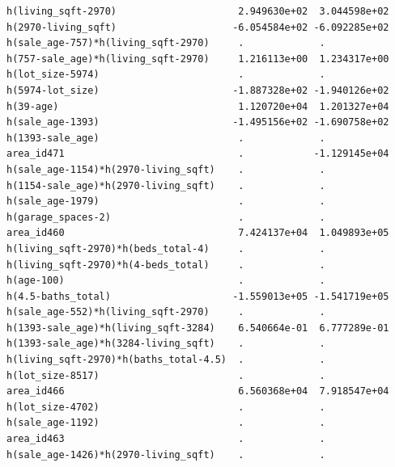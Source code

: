\documentclass[
]{article}
\begin{document}
\begin{verbatim}
h(living_sqft-2970)                     2.949630e+02  3.044598e+02
h(2970-living_sqft)                    -6.054584e+02 -6.092285e+02
h(sale_age-757)*h(living_sqft-2970)     .             .           
h(757-sale_age)*h(living_sqft-2970)     1.216113e+00  1.234317e+00
h(lot_size-5974)                        .             .           
h(5974-lot_size)                       -1.887328e+02 -1.940126e+02
h(39-age)                               1.120720e+04  1.201327e+04
h(sale_age-1393)                       -1.495156e+02 -1.690758e+02
h(1393-sale_age)                        .             .           
area_id471                              .            -1.129145e+04
h(sale_age-1154)*h(2970-living_sqft)    .             .           
h(1154-sale_age)*h(2970-living_sqft)    .             .           
h(sale_age-1979)                        .             .           
h(garage_spaces-2)                      .             .           
area_id460                              7.424137e+04  1.049893e+05
h(living_sqft-2970)*h(beds_total-4)     .             .           
h(living_sqft-2970)*h(4-beds_total)     .             .           
h(age-100)                              .             .           
h(4.5-baths_total)                     -1.559013e+05 -1.541719e+05
h(sale_age-552)*h(living_sqft-2970)     .             .           
h(1393-sale_age)*h(living_sqft-3284)    6.540664e-01  6.777289e-01
h(1393-sale_age)*h(3284-living_sqft)    .             .           
h(living_sqft-2970)*h(baths_total-4.5)  .             .           
h(lot_size-8517)                        .             .           
area_id466                              6.560368e+04  7.918547e+04
h(lot_size-4702)                        .             .           
h(sale_age-1192)                        .             .           
area_id463                              .             .           
h(sale_age-1426)*h(2970-living_sqft)    .             .           
                                                                  

\end{verbatim}
\end{document}
